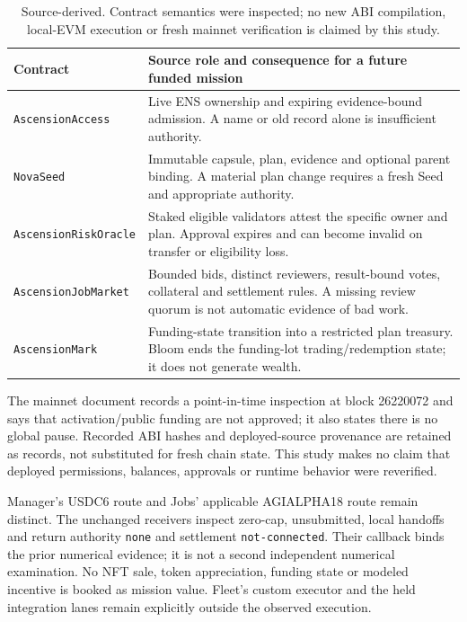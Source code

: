 \documentclass[11pt,a4paper]{article}
\newcommand{\source}{\textsf{Source-derived}}
\begin{document}
\begin{table}[ht]\centering\small
\begin{tabularx}{\linewidth}{@{}L{33mm}Y@{}}\toprule
Contract & Source role and consequence for a future funded mission \\\midrule
\texttt{AscensionAccess} & Live ENS ownership and expiring evidence-bound admission. A name or old record alone is insufficient authority. \\
\texttt{NovaSeed} & Immutable capsule, plan, evidence and optional parent binding. A material plan change requires a fresh Seed and appropriate authority. \\
\texttt{AscensionRiskOracle} & Staked eligible validators attest the specific owner and plan. Approval expires and can become invalid on transfer or eligibility loss. \\
\texttt{AscensionJobMarket} & Bounded bids, distinct reviewers, result-bound votes, collateral and settlement rules. A missing review quorum is not automatic evidence of bad work. \\
\texttt{AscensionMark} & Funding-state transition into a restricted plan treasury. Bloom ends the funding-lot trading/redemption state; it does not generate wealth. \\\bottomrule
\end{tabularx}
\caption{\source{}. Contract semantics were inspected; no new ABI compilation, local-EVM execution or fresh mainnet verification is claimed by this study.}
\label{tab:contracts}\end{table}

The mainnet document records a point-in-time inspection at block 26220072 and says that activation/public funding are not approved; it also states there is no global pause. \citep{mainnet2026} Recorded ABI hashes and deployed-source provenance are retained as records, not substituted for fresh chain state. This study makes no claim that deployed permissions, balances, approvals or runtime behavior were reverified.

Manager's USDC6 route and Jobs' applicable AGIALPHA18 route remain distinct. The unchanged receivers inspect zero-cap, unsubmitted, local handoffs and return authority \texttt{none} and settlement \texttt{not-connected}. Their callback binds the prior numerical evidence; it is not a second independent numerical examination. No NFT sale, token appreciation, funding state or modeled incentive is booked as mission value. Fleet's custom executor and the held integration lanes remain explicitly outside the observed execution.
\end{document}
